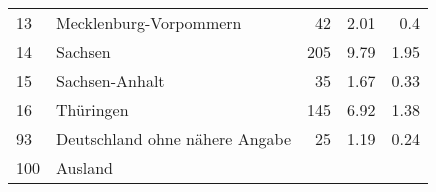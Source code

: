 \begin{longtable}{lXrrr}
     13 &
     \multicolumn{1}{X}{ Mecklenburg-Vorpommern   } &


       \num{42} &
       \num[round-mode=places,round-precision=2]{2.01} &
         \num[round-mode=places,round-precision=2]{0.4} \\

     14 &
     \multicolumn{1}{X}{ Sachsen   } &


       \num{205} &
       \num[round-mode=places,round-precision=2]{9.79} &
         \num[round-mode=places,round-precision=2]{1.95} \\

     15 &
     \multicolumn{1}{X}{ Sachsen-Anhalt   } &


       \num{35} &
       \num[round-mode=places,round-precision=2]{1.67} &
         \num[round-mode=places,round-precision=2]{0.33} \\

     16 &
     \multicolumn{1}{X}{ Thüringen   } &


       \num{145} &
       \num[round-mode=places,round-precision=2]{6.92} &
         \num[round-mode=places,round-precision=2]{1.38} \\

     93 &
     \multicolumn{1}{X}{ Deutschland ohne nähere Angabe   } &


       \num{25} &
       \num[round-mode=places,round-precision=2]{1.19} &
         \num[round-mode=places,round-precision=2]{0.24} \\

     100 &
     \multicolumn{1}{X}{ Ausland   } &



\end{longtable}
